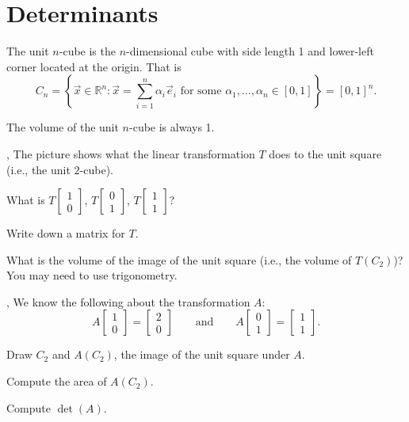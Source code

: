 \documentclass[letter]{article}
\newcommand{\R}{\mathbb{R}}
\newcommand{\mat}[1]{\begin{bmatrix}#1\end{bmatrix}}
\renewcommand{\emph}[1]{{\color{defcolor} \textbf{\textit{##1}}}}
\begin{document}
\newpage
\section*{Determinants}
	\vspace{-1cm}
	\begin{Def}
		The unit $n$-cube is the $n$-dimensional cube with side length 1 and lower-left
		corner located at the origin.  That is 
		\[
			C_n = \left\{\vec x\in\R^n:\vec x=\sum_{i=1}^n \alpha_i\vec e_i\text{ for some }\alpha_1,\ldots,\alpha_n\in[0,1]\right\}=[0,1]^n.
		\]
	\end{Def}
	The volume of the unit $n$-cube is always 1.

	\sep
	The picture shows what the linear transformation $T$ does to the unit square (i.e., the unit $2$-cube).



	\vspace{-6em}
	\begin{Enum}
		\item What is $T\mat{1\\0}$, $T\mat{0\\1}$, $T\mat{1\\1}$?
		\item Write down a matrix for $T$.
		\item What is the volume of the image of the unit square (i.e., the volume of $T(C_2)$)?  You may need
			to use trigonometry.
	\end{Enum}
	
	\vspace{-.7cm}

	\sep
	We know the following about the transformation $A$:
	\[
		A\mat{1\\0}=\mat{2\\0}\qquad\text{and}\qquad A\mat{0\\1}=\mat{1\\1}.
	\]
	\begin{Enum}
	\item Draw $C_2$ and $A(C_2)$, the image of the unit square
			under $A$.
		\item Compute the area of $A (C_2)$.
		\item Compute $\det(A)$.
	\end{Enum}
\end{document}
